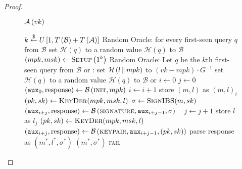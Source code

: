 \begin{proof}
      \begin{figure}[!htbp]
        \begin{algobox}{$\mathcal{A}\left(vk\right)$}
          \begin{algorithmic}[1]
            \State $k \overset{\$}{\gets} U\left[1, T\left(\mathcal{B}\right) +
            T\left(\mathcal{A}\right)\right]$
            \Indent
              \State Random Oracle: for every first-seen query $q$ from
              $\mathcal{B}$ set $\mathcal{H}\left(q\right)$ to a random value
              \State \Return $\mathcal{H}\left(q\right)$ to $\mathcal{B}$
            \EndIndent
            \State $\left(mpk, msk\right) \gets
            \textsc{Setup}\left(1^k\right)$
            \Indent
              \State Random Oracle: Let $q$ be the $k$th first-seen query from
              $\mathcal{B}$ or \adversary:
                \State set $\mathcal{H}\left(l \,\|\, mpk\right)$ to $\left(vk
                - mpk\right) \cdot G^{-1}$
              \Else
                \State set $\mathcal{H}\left(q\right)$ to a random value
              \EndIf
              \State \Return $\mathcal{H}\left(q\right)$ to $\mathcal{B}$ or
              \adversary
            \EndIndent
            \State $i \gets 0$
            \State $j \gets 0$
            \State $\left(\mathtt{aux}_0, \mathrm{response}\right) \gets
            \mathcal{B}\left(\textsc{init}, mpk\right)$
                \State $i \gets i + 1$
                \State store $(m, l)$ as $(m, l)_i$
                \State $(pk, sk) \gets \textsc{KeyDer}(mpk, msk, l)$
                \State $\sigma \gets \textsc{SignIBS}(m, sk)$
                \State $\left(\mathtt{aux}_{i+j}, \mathrm{response}\right) \gets
                \mathcal{B}\left(\textsc{signature}, \mathtt{aux}_{i+j-1},
                \sigma\right)$
              \Else \ 
                \State $j \gets j + 1$
                \State store $l$ as $l_j$
                \State $(pk, sk) \gets \textsc{KeyDer}(mpk, msk, l)$
                \State $\left(\mathtt{aux}_{i+j}, \mathrm{response}\right) \gets
                \mathcal{B}\left(\textsc{keypair}, \mathtt{aux}_{i+j-1}, (pk,
                sk)\right)$
              \EndIf
            \EndWhile
            \State parse response as $\left(m^*, l^*, \sigma^*\right)$
             
            \label{proof:ibs:distinguisher:won}
              \State \Return $\left(m^*, \sigma^*\right)$
            \Else
              \State \Return \textsc{fail}
            \EndIf
          \end{algorithmic}
        \end{algobox}
        \caption{}
        \label{proof:ibs:distinguisher}
      \end{figure}


\end{proof}
